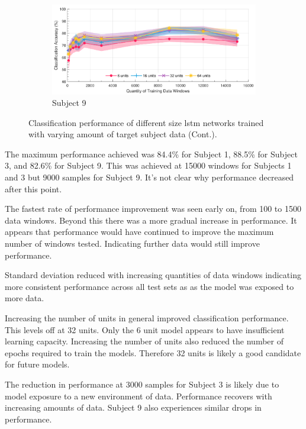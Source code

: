 \begin{figure}[t]\ContinuedFloat
    \begin{subfigure}[b]{\textwidth}
        \centering
        \includegraphics[width=\textwidth]{content/5-Personalisation/Bespoke_Target/ch5_bespoke_target_model_subject_9.pdf}
        \caption{Subject 9}
        \label{fig:ch5_32_unit_bespoke_model}
    \end{subfigure}
    \caption[]{Classification performance of different size \acrshort{lstm} networks trained with varying amount of target subject data (Cont.).}
\end{figure}

The maximum performance achieved was 84.4\% for Subject 1, 88.5\% for Subject 3, and 82.6\% for Subject 9. This was achieved at 15000 windows for Subjects 1 and 3 but 9000 samples for Subject 9. It's not clear why performance decreased after this point. 

The fastest rate of performance improvement was seen early on, from 100 to 1500 data windows. Beyond this there was a more gradual increase in performance. It appears that performance would have continued to improve the maximum number of windows tested. Indicating further data would still improve performance. 

Standard deviation reduced with increasing quantities of data windows indicating more consistent performance across all test sets as as the model was exposed to more data.

Increasing the number of units in general improved classification performance. This levels off at 32 units. Only the 6 unit model appears to have insufficient learning capacity. Increasing the number of units also reduced the number of epochs required to train the models. Therefore 32 units is likely a good candidate for future models.

The reduction in performance at 3000 samples for Subject 3 is likely due to model exposure to a new environment of data. Performance recovers with increasing amounts of data. Subject 9 also experiences similar drops in performance.

